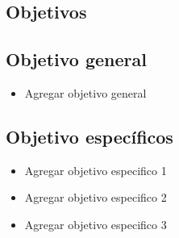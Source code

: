 
\subsection{Objetivos}

\subsection{Objetivo general}

\begin{itemize}
    \item Agregar objetivo general

\end{itemize}
\subsection{Objetivo específicos}

\begin{itemize}
    \item Agregar objetivo especifico 1
    \item Agregar objetivo especifico 2
    \item Agregar objetivo especifico 3

\end{itemize}